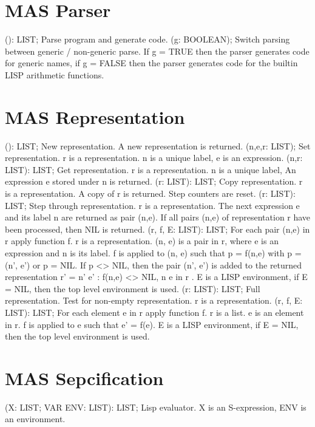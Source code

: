 \section{ MAS Parser  } 
 (): LIST; \eproc
\bcom Parse program and generate code.  \ecom 
{} (g: BOOLEAN); \eproc
\bcom Switch parsing between generic / non-generic parse.
If g = TRUE then the parser generates code for generic names, 
if g = FALSE then the parser generates code for the builtin LISP 
arithmetic functions.  \ecom 
\section{ MAS Representation  } 
 (): LIST; \eproc
\bcom New representation. A new representation is returned.  \ecom 
{} (n,e,r: LIST); \eproc
\bcom Set representation. r is a representation. n is a unique
label, e is an expression.  \ecom 
{} (n,r: LIST): LIST; \eproc
\bcom Get representation. r is a representation. n is a unique
label, An expression e stored under n is returned.  \ecom 
{} (r: LIST): LIST; \eproc
\bcom Copy representation. r is a representation. A copy of r is
returned. Step counters are reset.  \ecom 
{} (r: LIST): LIST; \eproc
\bcom Step through representation. r is a representation.
The next expression e and its label n are returned as pair (n,e). 
If all pairs (n,e) of representation r have been processed, 
then NIL is returned.  \ecom 
{} (r, f, E: LIST): LIST; \eproc
\bcom For each pair (n,e) in r apply function f. r is a representation.
(n, e) is a pair in r, where e is an expression and n is its label.
f is applied to (n, e) such that p = f(n,e) with p = (n', e') or p = NIL. 
If p <> NIL, then the pair (n', e') is added to the returned 
representation r' = { n' e' : f(n,e) <> NIL, n e in r }. E is a 
LISP environment, if E = NIL, then the top level environment is used.  \ecom 
{} (r: LIST): LIST; \eproc
\bcom Full representation. Test for non-empty representation.
r is a representation.  \ecom 
{} (r, f, E: LIST): LIST; \eproc
\bcom For each element e in r apply function f. r is a list. e is an
element in r. f is applied to e such that e' = f(e). 
E is a LISP environment, if E = NIL, then the top level environment 
is used.  \ecom 
\section{ MAS Sepcification  } 
 (X: LIST; VAR ENV: LIST): LIST; \eproc
\bcom Lisp evaluator. X is an S-expression, ENV is an environment.  \ecom 
